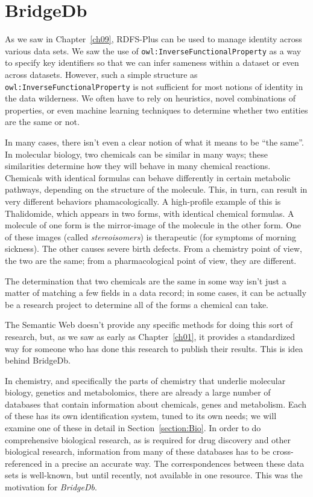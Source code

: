 \section{BridgeDb}

As we saw in Chapter~\ref{ch09}, RDFS-Plus can be used to manage identity 
across various data sets.  We saw the use of \texttt{owl:InverseFunctionalProperty}
as a way to specify key identifiers so that we can infer sameness within a 
dataset or even across datasets.  However, such a simple structure as 
\texttt{owl:InverseFunctionalProperty} is not sufficient for most notions of identity
in the data wilderness.  We often have to rely on heuristics, novel combinations
of properties, or even machine learning techniques to determine whether two 
entities are the same or not. 


In many cases, there isn't even a clear notion of what it means to be ``the same''.  
In molecular biology, two chemicals can be similar in many ways; these similarities 
determine how they will behave in many chemical reactions.  Chemicals with identical
formulas can behave differently in certain metabolic pathways, depending on the 
structure of the molecule.  This, in turn, can result in very different behaviors
phamacologically.  A high-profile example of this is Thalidomide, which appears in 
two forms, with identical chemical formulas.  A molecule of one form is the mirror-image
of the molecule in the other form.  One of these images (called \emph{stereoisomers}) 
is therapeutic (for symptoms of morning sickness).  The other causes severe birth
defects.  From a chemistry point of view, the two are the same; from a pharmacological 
point of view, they are different.  

The determination that two chemicals are the same in some way isn't just a matter of 
matching a few fields in a data record; in some cases, it can be actually be a research
project to determine all of the forms a chemical can take.  

The Semantic Web doesn't provide any specific methods for doing this sort of research, but,
as we saw as early as Chapter~\ref{ch01}, it provides a standardized way for someone 
who has done this research to publish their results.  This is idea behind BridgeDb.

In chemistry, and specifically the parts of chemistry that underlie molecular biology, genetics
and metabolomics, there are already a large number of databases that contain information 
about chemicals, genes and metabolism.  Each of these has its own identification system,
tuned to its own needs; we will examine one of these in detail in Section~\ref{section:Bio}.  
In order to do comprehensive biological research, as is required for drug discovery and 
other biological research, information from many of these databases has to be cross-referenced
in a precise an accurate way.  The correspondences between these data sets is well-known, 
but until recently, not available in one resource.  This was the motivation for \emph{BridgeDb}. 

